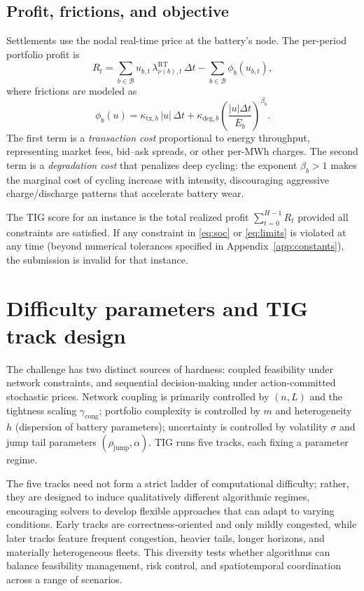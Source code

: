 \documentclass[11pt]{article}
\begin{document}
\subsection{Profit, frictions, and objective}
Settlements use the nodal real-time price at the battery's node. The per-period portfolio profit is
\begin{equation}\label{eq:reward}
R_t=\sum_{b\in\mathcal{B}} u_{b,t}\,\lambda^{\mathrm{RT}}_{\nu(b),t}\,\Delta t - \sum_{b\in\mathcal{B}} \phi_b(u_{b,t}),
\end{equation}
where frictions are modeled as
\begin{equation}\label{eq:friction}
\phi_b(u)=\kappa_{\mathrm{tx},b}\,|u|\,\Delta t + \kappa_{\mathrm{deg},b}\left(\frac{|u|\Delta t}{\overline{E}_b}\right)^{\beta_b}.
\end{equation}
The first term is a \emph{transaction cost} proportional to energy throughput, representing market fees, bid--ask spreads, or other per-MWh charges. The second term is a \emph{degradation cost} that penalizes deep cycling: the exponent $\beta_b>1$ makes the marginal cost of cycling increase with intensity, discouraging aggressive charge/discharge patterns that accelerate battery wear.

The TIG score for an instance is the total realized profit $\sum_{t=0}^{H-1}R_t$ provided all constraints are satisfied. If any constraint in \eqref{eq:soc} or \eqref{eq:limits} is violated at any time (beyond numerical tolerances specified in Appendix~\ref{app:constants}), the submission is invalid for that instance.

\section{Difficulty parameters and TIG track design}
The challenge has two distinct sources of hardness: coupled feasibility under network constraints, and sequential decision-making under action-committed stochastic prices. Network coupling is primarily controlled by $(n,L)$ and the tightness scaling $\gamma_{\mathrm{cong}}$; portfolio complexity is controlled by $m$ and heterogeneity $h$ (dispersion of battery parameters); uncertainty is controlled by volatility $\sigma$ and jump tail parameters $(\rho_{\mathrm{jump}},\alpha)$. TIG runs five tracks, each fixing a parameter regime.

The five tracks need not form a strict ladder of computational difficulty; rather, they are designed to induce qualitatively different algorithmic regimes, encouraging solvers to develop flexible approaches that can adapt to varying conditions. Early tracks are correctness-oriented and only mildly congested, while later tracks feature frequent congestion, heavier tails, longer horizons, and materially heterogeneous fleets. This diversity tests whether algorithms can balance feasibility management, risk control, and spatiotemporal coordination across a range of scenarios.
\end{document}
